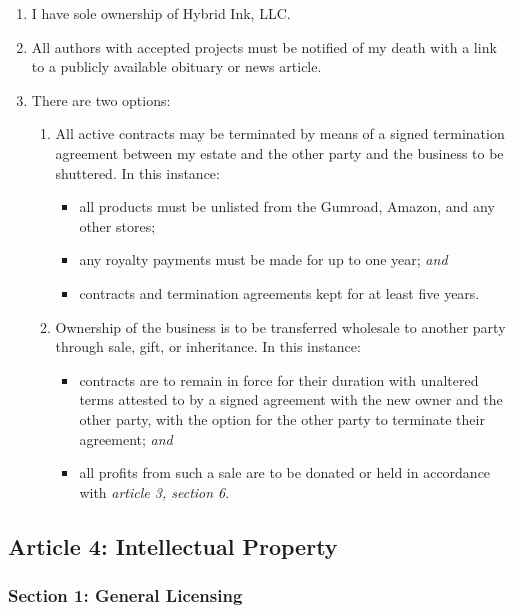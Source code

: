 \begin{enumerate}
\def\labelenumi{\arabic{enumi}.}
\tightlist
\item
  I have sole ownership of Hybrid Ink, LLC.
\item
  All authors with accepted projects must be notified of my death with a link to a publicly available obituary or news article.
\item
  There are two options:

  \begin{enumerate}
  \def\labelenumii{\arabic{enumii}.}
  \tightlist
  \item
    All active contracts may be terminated by means of a signed termination agreement between my estate and the other party and the business to be shuttered. In this instance:

    \begin{itemize}
    \tightlist
    \item
      all products must be unlisted from the Gumroad, Amazon, and any other stores;
    \item
      any royalty payments must be made for up to one year; \emph{and}
    \item
      contracts and termination agreements kept for at least five years.
    \end{itemize}
  \item
    Ownership of the business is to be transferred wholesale to another party through sale, gift, or inheritance. In this instance:

    \begin{itemize}
    \tightlist
    \item
      contracts are to remain in force for their duration with unaltered terms attested to by a signed agreement with the new owner and the other party, with the option for the other party to terminate their agreement; \emph{and}
    \item
      all profits from such a sale are to be donated or held in accordance with \emph{article 3, section 6}.
    \end{itemize}
  \end{enumerate}
\end{enumerate}

\subsection*{Article 4: Intellectual Property}\label{article-4-intellectual-property}

\subsubsection*{Section 1: General Licensing}\label{section-1-general-licensing}

